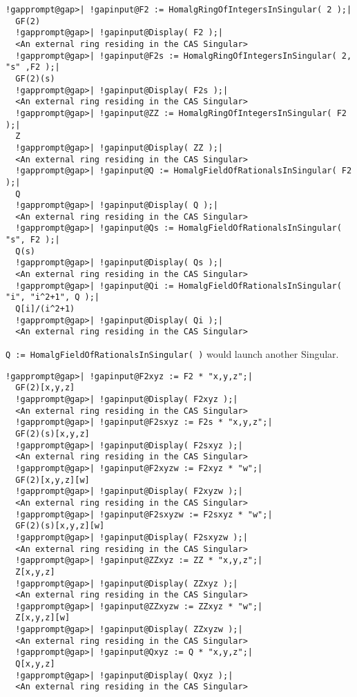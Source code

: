 \documentclass[a4paper,11pt]{report}
\begin{document}
{{{\begin{Verbatim}[commandchars=!@|,fontsize=\small,frame=single,label=Example]
  !gapprompt@gap>| !gapinput@F2 := HomalgRingOfIntegersInSingular( 2 );|
  GF(2)
  !gapprompt@gap>| !gapinput@Display( F2 );|
  <An external ring residing in the CAS Singular>
  !gapprompt@gap>| !gapinput@F2s := HomalgRingOfIntegersInSingular( 2, "s" ,F2 );|
  GF(2)(s)
  !gapprompt@gap>| !gapinput@Display( F2s );|
  <An external ring residing in the CAS Singular>
  !gapprompt@gap>| !gapinput@ZZ := HomalgRingOfIntegersInSingular( F2 );|
  Z
  !gapprompt@gap>| !gapinput@Display( ZZ );|
  <An external ring residing in the CAS Singular>
  !gapprompt@gap>| !gapinput@Q := HomalgFieldOfRationalsInSingular( F2 );|
  Q
  !gapprompt@gap>| !gapinput@Display( Q );|
  <An external ring residing in the CAS Singular>
  !gapprompt@gap>| !gapinput@Qs := HomalgFieldOfRationalsInSingular( "s", F2 );|
  Q(s)
  !gapprompt@gap>| !gapinput@Display( Qs );|
  <An external ring residing in the CAS Singular>
  !gapprompt@gap>| !gapinput@Qi := HomalgFieldOfRationalsInSingular( "i", "i^2+1", Q );|
  Q[i]/(i^2+1)
  !gapprompt@gap>| !gapinput@Display( Qi );|
  <An external ring residing in the CAS Singular>
\end{Verbatim}
 \texttt{Q := HomalgFieldOfRationalsInSingular( )} would launch another Singular. 
\begin{Verbatim}[commandchars=!@|,fontsize=\small,frame=single,label=Example]
  !gapprompt@gap>| !gapinput@F2xyz := F2 * "x,y,z";|
  GF(2)[x,y,z]
  !gapprompt@gap>| !gapinput@Display( F2xyz );|
  <An external ring residing in the CAS Singular>
  !gapprompt@gap>| !gapinput@F2sxyz := F2s * "x,y,z";|
  GF(2)(s)[x,y,z]
  !gapprompt@gap>| !gapinput@Display( F2sxyz );|
  <An external ring residing in the CAS Singular>
  !gapprompt@gap>| !gapinput@F2xyzw := F2xyz * "w";|
  GF(2)[x,y,z][w]
  !gapprompt@gap>| !gapinput@Display( F2xyzw );|
  <An external ring residing in the CAS Singular>
  !gapprompt@gap>| !gapinput@F2sxyzw := F2sxyz * "w";|
  GF(2)(s)[x,y,z][w]
  !gapprompt@gap>| !gapinput@Display( F2sxyzw );|
  <An external ring residing in the CAS Singular>
  !gapprompt@gap>| !gapinput@ZZxyz := ZZ * "x,y,z";|
  Z[x,y,z]
  !gapprompt@gap>| !gapinput@Display( ZZxyz );|
  <An external ring residing in the CAS Singular>
  !gapprompt@gap>| !gapinput@ZZxyzw := ZZxyz * "w";|
  Z[x,y,z][w]
  !gapprompt@gap>| !gapinput@Display( ZZxyzw );|
  <An external ring residing in the CAS Singular>
  !gapprompt@gap>| !gapinput@Qxyz := Q * "x,y,z";|
  Q[x,y,z]
  !gapprompt@gap>| !gapinput@Display( Qxyz );|
  <An external ring residing in the CAS Singular>

\end{Verbatim}}}}
\end{document}
